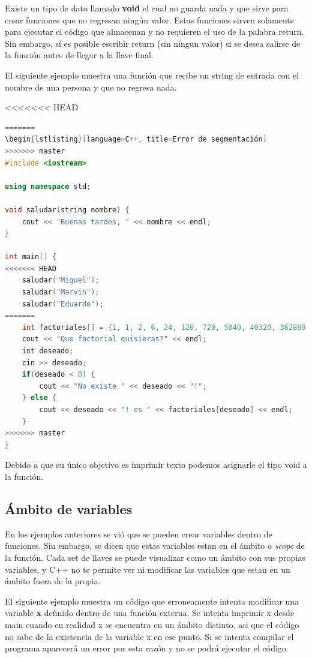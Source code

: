 \documentclass{article}
\begin{document}
Existe un tipo de dato llamado \textbf{void} el cual no guarda nada y que sirve para crear funciones que no regresan ningún valor. Estas funciones sirven solamente para ejecutar el código que almacenan y no requieren el uso de la palabra return. Sin embargo, sí es posible escribir return (sin ningun valor) si se desea salirse de la función antes de llegar a la llave final.

El siguiente ejemplo muestra una función que recibe un string de entrada con el nombre de una persona y que no regresa nada.

<<<<<<< HEAD
\begin{lstlisting}[language=C++, title=Saludo]
=======
\begin{lstlisting}[language=C++, title=Error de segmentación]
>>>>>>> master
#include <iostream>

using namespace std;

void saludar(string nombre) {
	cout << "Buenas tardes, " << nombre << endl;
}

int main() {
<<<<<<< HEAD
	saludar("Miguel");
	saludar("Marvin");
	saludar("Eduardo");
=======
	int factoriales[] = {1, 1, 2, 6, 24, 120, 720, 5040, 40320, 362880, 3628800};
	cout << "Que factorial quisieras?" << endl;
	int deseado;
	cin >> deseado;
	if(deseado < 0) {
		cout << "No existe " << deseado << "!";
	} else {
		cout << deseado << "! es " << factoriales[deseado] << endl;
	}
>>>>>>> master
}
\end{lstlisting}

Debido a que su único objetivo es imprimir texto podemos asignarle el tipo void a la función.

\subsection{Ámbito de variables}

En los ejemplos anteriores se vió que se pueden crear variables dentro de funciones. Sin embargo, se dicen que estas variables estan en el ámbito o \textit{scope} de la función. Cada set de llaves se puede visualizar como un ámbito con sus propias variables, y C++ no te permite ver ni modificar las variables que estan en un ámbito fuera de la propia.

El siguiente ejemplo muestra un código que erroneamente intenta modificar una variable \textbf{x} definido dentro de una función externa. Se intenta imprimir x desde main cuando en realidad x se encuentra en un ámbito distinto, asi que el código no sabe de la existencia de la variable x en ese punto. Si se intenta compilar el programa aparecerá un error por esta razón y no se podrá ejecutar el código.
\end{document}
